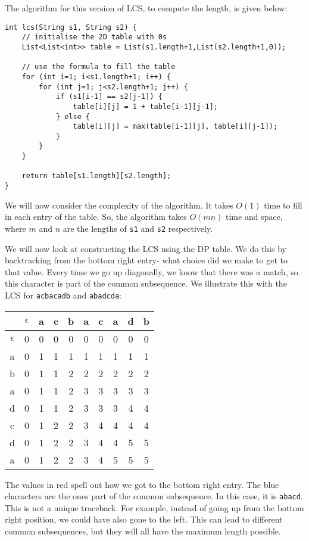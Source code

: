 \documentclass[a4paper, openany]{memoir}
\begin{document}
    The algorithm for this version of LCS, to compute the length, is given below:
\begin{lstlisting}[language=pseudocode]
int lcs(String s1, String s2) {
    // initialise the 2D table with 0s
    List<List<int>> table = List(s1.length+1,List(s2.length+1,0));

    // use the formula to fill the table
    for (int i=1; i<s1.length+1; i++) {
        for (int j=1; j<s2.length+1; j++) {
            if (s1[i-1] == s2[j-1]) {
                table[i][j] = 1 + table[i-1][j-1];
            } else {
                table[i][j] = max(table[i-1][j], table[i][j-1]);
            }
        }
    }

    return table[s1.length][s2.length];
}
\end{lstlisting}
    We will now consider the complexity of the algorithm. It takes $O(1)$ time to fill in each entry of the table. So, the algorithm takes $O(mn)$ time and space, where $m$ and $n$ are the lengths of \texttt{s1} and \texttt{s2} respectively.

    We will now look at constructing the LCS using the DP table. We do this by backtracking from the bottom right entry- what choice did we make to get to that value. Every time we go up diagonally, we know that there was a match, so this character is part of the common subsequence. We illustrate this with the LCS for \texttt{acbacadb} and \texttt{abadcda}:
    \begin{table}[H]
        \centering
        \begin{tabular}{c|ccccccccc}
            & $\epsilon$ & {\color{blue} a} & c & {\color{blue} b} & {\color{blue} a} & {\color{blue} c} & a & {\color{blue} d} & b \\
            \hline 
            $\epsilon$ & {\color{red} 0} & 0 & 0 & 0 & 0 & 0 & 0 & 0 & 0 \\
            {\color{blue} a} & 0 & {\color{red} 1} & {\color{red} 1} & 1 & 1 & 1 & 1 & 1 & 1 \\
            {\color{blue} b} & 0 & 1 & 1 & {\color{red} 2} & 2 & 2 & 2 & 2 & 2 \\
            {\color{blue} a} & 0 & 1 & 1 & 2 & {\color{red} 3} & 3 & 3 & 3 & 3 \\
            d & 0 & 1 & 1 & 2 & {\color{red} 3} & 3 & 3 & 4 & 4 \\
            {\color{blue} c} & 0 & 1 & 2 & 2 & 3 & {\color{red} 4} & {\color{red} 4} & 4 & 4 \\
            {\color{blue} d} & 0 & 1 & 2 & 2 & 3 & 4 & 4 & {\color{red} 5} & {\color{red} 5} \\
            a & 0 & 1 & 2 & 2 & 3 & 4 & 5 & 5 & {\color{red} 5} 
        \end{tabular}
    \end{table}
    \noindent The values in red spell out how we got to the bottom right entry. The blue characters are the ones part of the common subsequence. In this case, it is \texttt{abacd}. This is not a unique traceback. For example, instead of going up from the bottom right position, we could have also gone to the left. This can lead to different common subsequences, but they will all have the maximum length possible.
    
\end{document}
